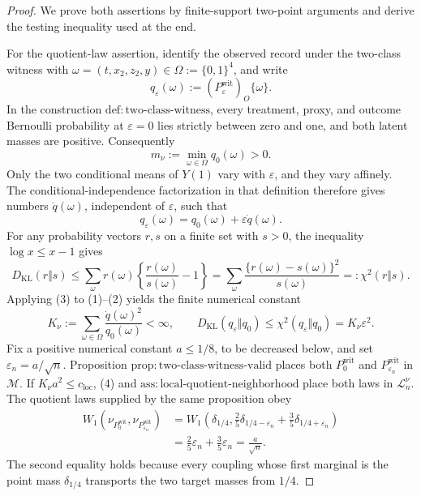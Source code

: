 \documentclass{article}
\begin{document}
\begin{proof}
We prove both assertions by finite-support two-point arguments and derive the testing inequality used at the end.

For the quotient-law assertion, identify the observed record under the two-class witness with
\(\omega=(t,x_2,z_2,y)\in\Omega:=\{0,1\}^4\), and write
\[
 q_\varepsilon(\omega):=(P_\varepsilon^{\mathrm{wit}})_O\{\omega\}.
\]
In the construction \(\mathrm{def:two\text{-}class\text{-}witness}\), every treatment, proxy, and outcome Bernoulli probability at \(\varepsilon=0\) lies strictly between zero and one, and both latent masses are positive.  Consequently
\[
 m_\nu:=\min_{\omega\in\Omega}q_0(\omega)>0.                                      \tag{1}
\]
Only the two conditional means of \(Y(1)\) vary with \(\varepsilon\), and they vary affinely.  The conditional-independence factorization in that definition therefore gives numbers \(\dot q(\omega)\), independent of \(\varepsilon\), such that
\[
 q_\varepsilon(\omega)=q_0(\omega)+\varepsilon\dot q(\omega).                    \tag{2}
\]
For any probability vectors \(r,s\) on a finite set with \(s>0\), the inequality \(\log x\le x-1\) gives
\[
 D_{\mathrm{KL}}(r\Vert s)
 \le \sum_\omega r(\omega)\left\{\frac{r(\omega)}{s(\omega)}-1\right\}
 =\sum_\omega\frac{\{r(\omega)-s(\omega)\}^2}{s(\omega)}
 =:\chi^2(r\Vert s).                                                              \tag{3}
\]
Applying (3) to (1)--(2) yields the finite numerical constant
\[
 K_\nu:=\sum_{\omega\in\Omega}\frac{\dot q(\omega)^2}{q_0(\omega)}<\infty,
 \qquad
 D_{\mathrm{KL}}(q_\varepsilon\Vert q_0)
 \le\chi^2(q_\varepsilon\Vert q_0)=K_\nu\varepsilon^2.                         \tag{4}
\]
Fix a positive numerical constant \(a\le1/8\), to be decreased below, and set \(\varepsilon_n=a/\sqrt n\).  Proposition \(\mathrm{prop:two\text{-}class\text{-}witness\text{-}valid}\) places both \(P_0^{\mathrm{wit}}\) and \(P_{\varepsilon_n}^{\mathrm{wit}}\) in \(\mathcal M\).  If \(K_\nu a^2\le c_{\mathrm{loc}}\), (4) and \(\mathrm{ass:local\text{-}quotient\text{-}neighborhood}\) place both laws in \(\mathcal L_n^\nu\).  The quotient laws supplied by the same proposition obey
\[
 \begin{split}
 W_1\!\left(\nu_{P_0^{\mathrm{wit}}},\nu_{P_{\varepsilon_n}^{\mathrm{wit}}}\right)
 &=W_1\!\left(\delta_{1/4},\frac25\delta_{1/4-\varepsilon_n}
                   +\frac35\delta_{1/4+\varepsilon_n}\right)\\
 &=\frac25\varepsilon_n+\frac35\varepsilon_n
 =\frac a{\sqrt n}.                                                               \tag{5}
 \end{split}
\]
The second equality holds because every coupling whose first marginal is the point mass \(\delta_{1/4}\) transports the two target masses from \(1/4\).


\end{proof}
\end{document}
